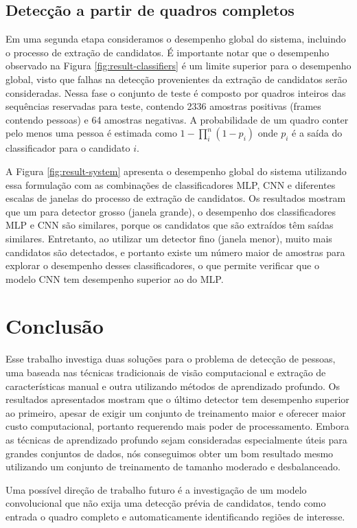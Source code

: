    \begin{figure*}
    \vspace{-3ex}
    \centering
    \label{fig:result-system-all}
    \hfil
    \label{fig:result-system-all-zoom}
    \caption{Desempenho global do sistema.}
    \label{fig:result-system}
    \end{figure*}


\subsection{Detecção a partir de quadros completos}
    Em uma segunda etapa consideramos o desempenho global do sistema, incluindo o processo de extração de candidatos. É importante notar que o desempenho observado na Figura \ref{fig:result-classifiers} é um limite superior para o desempenho global, visto que falhas na detecção provenientes da extração de candidatos serão consideradas. Nessa fase o conjunto de teste é composto por quadros inteiros das sequências reservadas para teste, contendo 2336 amostras positivas (frames contendo pessoas) e 64 amostras negativas. A probabilidade de um quadro conter pelo menos uma pessoa é estimada como $1 - \prod_i^n (1-p_i)$ onde $p_i$ é a saída do classificador para o candidato $i$.

    A Figura \ref{fig:result-system} apresenta o desempenho global do sistema utilizando essa formulação com as combinações de classificadores MLP, CNN e diferentes escalas de janelas do processo de extração de candidatos. Os resultados mostram que um para detector grosso (janela grande), o desempenho dos classificadores MLP e CNN são similares, porque os candidatos que são extraídos têm saídas similares. Entretanto, ao utilizar um detector fino (janela menor), muito mais candidatos são detectados, e portanto existe um número maior de amostras para explorar o desempenho desses classificadores, o que permite verificar que o modelo CNN tem desempenho superior ao do MLP.


\section{Conclusão}
\label{sec:conclusion}

    Esse trabalho investiga duas soluções para o problema de detecção de pessoas, uma baseada nas técnicas tradicionais de visão computacional e extração de características manual e outra utilizando métodos de aprendizado profundo. Os resultados apresentados  mostram que o último detector tem desempenho superior ao primeiro, apesar de exigir um conjunto de treinamento maior e oferecer maior custo computacional, portanto requerendo mais poder de processamento. Embora as técnicas de aprendizado profundo sejam consideradas especialmente úteis para grandes conjuntos de dados, nós conseguimos obter um bom resultado mesmo utilizando um conjunto de treinamento de tamanho moderado e desbalanceado.

    Uma possível direção de trabalho futuro é a investigação de um modelo convolucional que não exija uma detecção prévia de candidatos, tendo como entrada o quadro completo e automaticamente identificando regiões de interesse.
